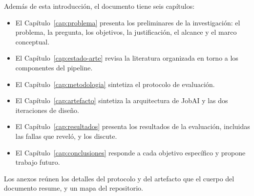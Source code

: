 Además de esta introducción, el documento tiene seis capítulos:
\begin{itemize}
    \item El Capítulo~\ref{cap:problema} presenta los preliminares de la investigación: el problema, la pregunta, los objetivos, la justificación, el alcance y el marco conceptual.
    \item El Capítulo~\ref{cap:estado-arte} revisa la literatura organizada en torno a los componentes del pipeline.
    \item El Capítulo~\ref{cap:metodologia} sintetiza el protocolo de evaluación.
    \item El Capítulo~\ref{cap:artefacto} sintetiza la arquitectura de JobAI y las dos iteraciones de diseño.
    \item El Capítulo~\ref{cap:resultados} presenta los resultados de la evaluación, incluidas las fallas que reveló, y los discute.
    \item El Capítulo~\ref{cap:conclusiones} responde a cada objetivo específico y propone trabajo futuro.
\end{itemize}
Los anexos reúnen los detalles del protocolo y del artefacto que el cuerpo del documento resume, y un mapa del repositorio.
